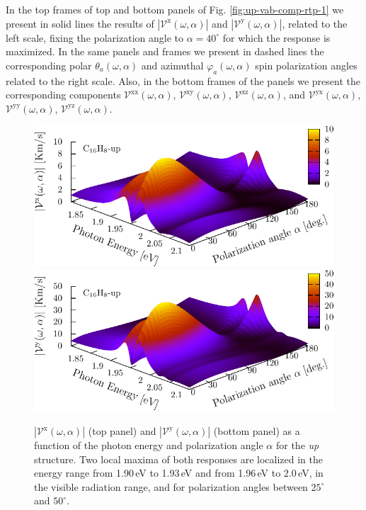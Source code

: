 \documentclass[prb,11pt,tightenlines,twocolumn,aps]{revtex4-1}
\begin{document}
In the top frames of top and bottom panels of Fig. \ref{fig:up-vab-comp-rtp-1}
we present in solid lines the results of
$|\mathcal{V}^{\mathrm{x}}(\omega,\alpha)|$ and
$|\mathcal{V}^{\mathrm{y}}(\omega,\alpha)|$, related to the left scale, fixing
the polarization angle to $\alpha=40^{\circ}$ for which the response is
maximized. In the same panels and frames we present in dashed lines the
corresponding polar $\theta_{a}(\omega,\alpha)$ and azimuthal
$\varphi_{a}(\omega,\alpha)$ spin polarization angles related to the right
scale. Also, in the bottom frames of the panels we present the corresponding
components $\mathcal{V}^{\mathrm{xx}}(\omega,\alpha)$,
$\mathcal{V}^{\mathrm{xy}}(\omega,\alpha)$,
$\mathcal{V}^{\mathrm{xz}}(\omega,\alpha)$, and
$\mathcal{V}^{\mathrm{yx}}(\omega,\alpha)$,
$\mathcal{V}^{\mathrm{yy}}(\omega,\alpha)$,
$\mathcal{V}^{\mathrm{yz}}(\omega,\alpha)$.
\begin{figure}[t]
    \centering
    \includegraphics[width=\linewidth]{upplots/up-3d-vxb-2}
    \\
    \includegraphics[width=\linewidth]{upplots/up-3d-vyb-2}
    
    \caption{$|\mathcal{V}^{\mathrm{x}}(\omega,\alpha)|$ (top panel) and
    $|\mathcal{V}^{\mathrm{y}}(\omega,\alpha)|$ (bottom panel)  as a function
    of the photon energy and polarization angle $\alpha$ for the \emph{up}
    structure. Two local maxima of both responses are localized in the energy
    range from 1.90\,eV to 1.93\,eV and from 1.96\,eV to 2.0\,eV, in the
    visible radiation range, and for polarization angles between $25^{\circ}$
    and $50^{\circ}$.}
    \label{fig:up-3d-vva-2}
\end{figure}
\end{document}
